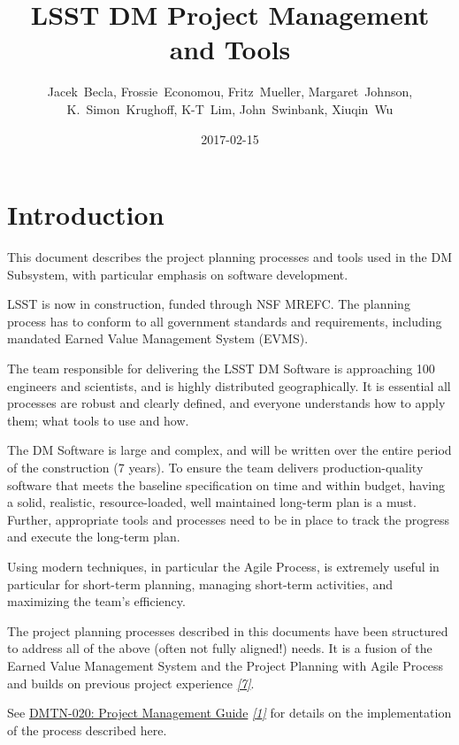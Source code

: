 \documentclass[DM,toc]{lsstdoc}
\title[LSST DM Project Management and Tools]{LSST DM Project Management and Tools}
\author{Jacek~Becla, Frossie~Economou, Fritz~Mueller, Margaret~Johnson, K.~Simon~Krughoff, K-T~Lim, John~Swinbank, Xiuqin~Wu}
\date{2017-02-15}
\newcommand{\sphinxcrossref}[1]{\emph{#1}}
\newenvironment{sphinxnote}[1]
  {\begin{tcolorbox}[colback=sphinxnoteBgColor,title=#1]}{\end{tcolorbox}}
\begin{document}
\maketitle

\section{Introduction}
\label{\detokenize{index:id1}}\label{\detokenize{index:change-record}}\label{\detokenize{index:intro}}\label{\detokenize{index:introduction}}
This document describes the project planning processes and tools used in the
DM Subsystem, with particular emphasis on software development.

LSST is now in construction, funded through NSF MREFC. The planning process has
to conform to all government standards and requirements, including mandated
Earned Value Management System (EVMS).

The team responsible for delivering the LSST DM Software is approaching 100 engineers and
scientists, and is highly distributed geographically. It is essential all processes are robust
and clearly defined, and everyone understands how to apply them; what tools to use and how.

The DM Software is large and complex, and will be written over the entire period of
the construction (7 years). To ensure the team delivers production-quality software
that meets the baseline specification on time and within budget, having a solid, realistic,
resource-loaded, well maintained long-term plan is a must. Further,
appropriate tools and processes need to be in place to track the progress and
execute the long-term plan.

Using modern techniques, in particular the Agile Process, is extremely useful in particular
for short-term planning, managing short-term activities, and maximizing
the team's efficiency.

The project planning processes described in this documents have been structured to
address all of the above (often not fully aligned!) needs. It is a fusion of
the Earned Value Management System and the Project Planning with Agile Process and builds
on previous project experience \label{\detokenize{index:id2}}{\hyperref[\detokenize{index:spie-9911e-0nk}]{\sphinxcrossref{{[}7{]}}}}.

\begin{sphinxnote}{Note:}
See \href{https://dmtn-020.lsst.io}{DMTN-020: Project Management Guide} \label{\detokenize{index:id3}}{\hyperref[\detokenize{index:dmtn-020}]{\sphinxcrossref{{[}1{]}}}} for
details on the implementation of the process described here.
\end{sphinxnote}
\end{document}
